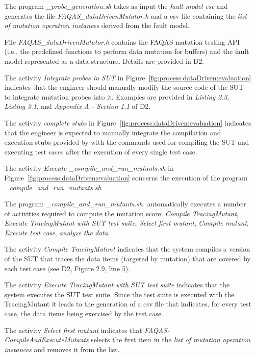The program \emph{\dama\_probe\_generation.sh} takes as input the \emph{fault model csv} and generates the file \emph{FAQAS\_dataDrivenMutator.h} and a csv file containing the \emph{list of mutation operation instances} derived from the fault model.

File \emph{FAQAS\_dataDrivenMutator.h} contains the FAQAS mutation testing API (i.e., the predefined functions to perform data mutation for buffers) and the fault model represented as a data structure. Details are provided in D2.

The activity \emph{Integrate probes in SUT} in Figure~\ref{fig:process:dataDriven:evaluation} indicates that the engineer should manually modify the source code of the SUT to integrate mutation probes into it. Examples are provided in \emph{Listing 2.3}, \emph{Listing 3.1}, and \emph{Appendix A - Section 1.1} of D2.

The activity \emph{complete \dama stubs} in Figure~\ref{fig:process:dataDriven:evaluation} indicates that the engineer is expected to manually integrate the compilation and execution stubs provided by \dama with the commands used for compiling the SUT and executing test cases after the execution of every single test case.

The activity \emph{Execute \dama\_compile\_and\_run\_mutants.sh} in Figure~\ref{fig:process:dataDriven:evaluation} concerns the execution of the program \emph{\dama\_compile\_and\_run\_mutants.sh}

The program \emph{\dama\_compile\_and\_run\_mutants.sh.} automatically executes a number of activities required to compute the mutation score: \emph{Compile TracingMutant}, \emph{Execute TracingMutant with SUT test suite}, \emph{Select first mutant}, \emph{Compile mutant}, \emph{Execute test case},  \emph{analyze the data}.

The activity \emph{Compile TracingMutant} indicates that the system compiles a version of the SUT that traces the data items (targeted by mutation) that are covered by each test case (see D2, Figure 2.9, line 5).

The activity \emph{Execute TracingMutant with SUT test suite} indicates that the system executes the SUT test suite. Since the test suite is executed with the TracingMutant it leads to the generation of a csv file that indicates, for every test case, the data items being exercised by the test case.

The activity \emph{Select first mutant} indicates that  \emph{FAQAS-CompileAndExecuteMutants} selects the first item in the \emph{list of mutation operation instances} and removes it from the list.

